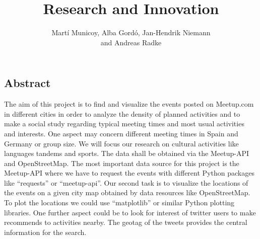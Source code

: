 \documentclass[12pt,a4paper]{article}
\author{Martí Municoy, Alba Gordó, Jan-Hendrik Niemann\\ and Andreas Radke}
\title{Research and Innovation}
\begin{document}
	\maketitle
	
\subsection*{Abstract}
The aim of this project is to find and visualize the events posted on Meetup.com in different cities in order to analyze the density of planned activities and to make a social study regarding typical meeting times and most usual activities and interests. One aspect may concern different meeting times in Spain and Germany or group size. We will focus our research on cultural activities like languages tandems and sports. The data shall be obtained via the Meetup-API and OpenStreetMap. The most important data source for this project is the Meetup-API where we have to request the events with different Python packages like “requests” or “meetup-api”. Our second task is to visualize the locations of the events on a given city map obtained by data resources like OpenStreetMap. To plot the locations we could use “matplotlib” or similar Python plotting libraries.
One further aspect could be to look for interest of twitter users to make recommends to activities nearby. The geotag of the tweets provides the central information for the search.

\cite{meetupapi}
	








{}

\end{document}
